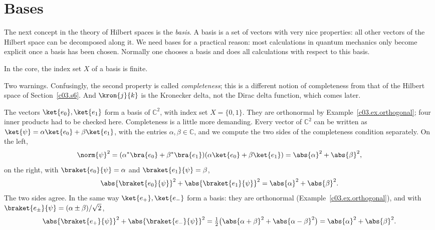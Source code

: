 \section{Bases}\label{c03.s7}

The next concept in the theory of Hilbert spaces is the \emph{basis}. A basis is a set of
vectors with very nice properties: all other vectors of the Hilbert space can be decomposed
along it. We need bases for a practical reason: most calculations in quantum mechanics only
become explicit once a basis has been chosen. Normally one chooses a basis and does all
calculations with respect to this basis.

In the core, the index set $X$ of a basis is finite.


Two warnings. Confusingly, the second property is called \emph{completeness}; this is a
different notion of completeness from that of the Hilbert space of Section~\ref{c03.s6}. And $\kron{j}{k}$
is the Kronecker delta, not the Dirac delta function, which comes later.

\begin{example}\label{c03.ex.basis}
  The vectors $\ket{e_0}, \ket{e_1}$ form a basis of $\mathbb{C}^2$, with index set
  $X = \{0, 1\}$. They are orthonormal by Example~\ref{c03.ex.orthogonal}; four inner products
  had to be checked here. Completeness is a little more demanding. Every vector of
  $\mathbb{C}^2$ can be written as $\ket{\psi} = \alpha \ket{e_0} + \beta \ket{e_1}$, with the
  entries $\alpha, \beta \in \mathbb{C}$, and we compute the two sides of the completeness
  condition separately. On the left,
  \begin{equation}\label{c03.eq.basis-links}
    \norm{\psi}^2 = (\alpha^* \bra{e_0} + \beta^* \bra{e_1}) (\alpha \ket{e_0} + \beta \ket{e_1})
    = \abs{\alpha}^2 + \abs{\beta}^2 ,
  \end{equation}
  on the right, with $\braket{e_0}{\psi} = \alpha$ and $\braket{e_1}{\psi} = \beta$,
  \begin{equation}\label{c03.eq.basis-rechts}
    \abs{\braket{e_0}{\psi}}^2 + \abs{\braket{e_1}{\psi}}^2 = \abs{\alpha}^2 + \abs{\beta}^2 .
  \end{equation}
  The two sides agree. In the same way $\ket{e_+}, \ket{e_-}$ form a basis: they are
  orthonormal (Example~\ref{c03.ex.orthogonal}), and with
  $\braket{e_\pm}{\psi} = (\alpha \pm \beta) / \sqrt{2}$,
  \begin{equation}\label{c03.eq.basis-pm}
    \abs{\braket{e_+}{\psi}}^2 + \abs{\braket{e_-}{\psi}}^2
    = \tfrac12 \bigl( \abs{\alpha + \beta}^2 + \abs{\alpha - \beta}^2 \bigr)
    = \abs{\alpha}^2 + \abs{\beta}^2 .
  \end{equation}
\end{example}

